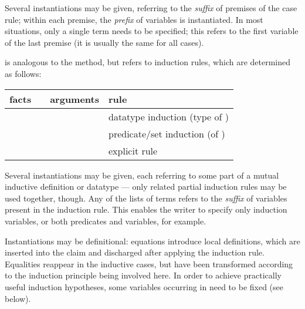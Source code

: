\begin{isabellebody}
\begin{isamarkuptext}
\begin{descr}
  Several instantiations may be given, referring to the \emph{suffix}
  of premises of the case rule; within each premise, the \emph{prefix}
  of variables is instantiated.  In most situations, only a single
  term needs to be specified; this refers to the first variable of the
  last premise (it is usually the same for all cases).

  \item [\hyperlink{method.induct}{\mbox{\isa{induct}}}~\isa{{\isachardoublequote}insts\ R{\isachardoublequote}}] is analogous to the
  \hyperlink{method.cases}{\mbox{}} method, but refers to induction rules, which are
  determined as follows:

  \medskip
  \begin{tabular}{llll}
    facts           &                  & arguments            & rule \\\hline
                    & \hyperlink{method.induct}{\mbox{\isa{induct}}} & \isa{{\isachardoublequote}P\ x{\isachardoublequote}}        & datatype induction (type of \isa{x}) \\
    \isa{{\isachardoublequote}{\isasymturnstile}\ A\ x{\isachardoublequote}} & \hyperlink{method.induct}{\mbox{\isa{induct}}} & \isa{{\isachardoublequote}{\isasymdots}{\isachardoublequote}}          & predicate/set induction (of \isa{A}) \\
    \isa{{\isachardoublequote}{\isasymdots}{\isachardoublequote}}     & \hyperlink{method.induct}{\mbox{\isa{induct}}} & \isa{{\isachardoublequote}{\isasymdots}\ rule{\isacharcolon}\ R{\isachardoublequote}} & explicit rule \isa{R} \\
  \end{tabular}
  \medskip
  
  Several instantiations may be given, each referring to some part of
  a mutual inductive definition or datatype --- only related partial
  induction rules may be used together, though.  Any of the lists of
  terms  refers to the \emph{suffix} of variables
  present in the induction rule.  This enables the writer to specify
  only induction variables, or both predicates and variables, for
  example.
  
  Instantiations may be definitional: equations 
  introduce local definitions, which are inserted into the claim and
  discharged after applying the induction rule.  Equalities reappear
  in the inductive cases, but have been transformed according to the
  induction principle being involved here.  In order to achieve
  practically useful induction hypotheses, some variables occurring in
   need to be fixed (see below).
  

\end{descr}
\end{isamarkuptext}
\end{isabellebody}
